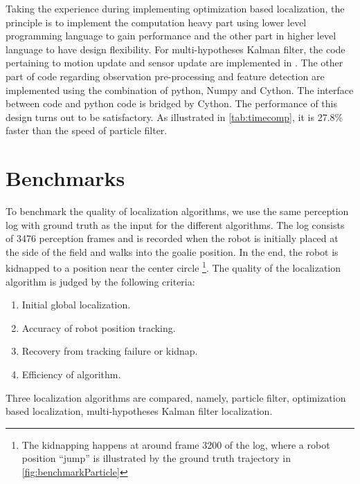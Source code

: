 Taking the experience during implementing optimization based localization, the principle is to implement the computation heavy part using lower level programming language to gain performance and the other part in higher level language to have design flexibility.
For multi-hypotheses Kalman filter, the code pertaining to motion update and sensor update are implemented in \cpp. The other part of code regarding observation pre-processing and feature detection are implemented using the combination of python, Numpy and Cython. The interface between \cpp  code and python code is bridged by Cython. The performance of this design turns out to be satisfactory. As illustrated in \autoref{tab:timecomp}, it is 27.8\% faster than the speed of particle filter.

\section{Benchmarks}
\label{sec:Benchmark}
To benchmark the quality of localization algorithms, we use the same perception log with ground truth as the input for the different algorithms. The log consists of 3476 perception frames and is recorded when the robot is initially placed at the side of the field and walks into the goalie position. In the end, the robot is kidnapped to a position near the center circle \footnote{The kidnapping happens at around frame 3200 of the log, where a robot position ``jump'' is illustrated by the ground truth trajectory in \autoref{fig:benchmarkParticle}}. The quality of the localization algorithm is judged by the following criteria: 
\begin{enumerate}
  \item Initial global localization.
  \item Accuracy of robot position tracking.
  \item Recovery from tracking failure or kidnap.
  \item Efficiency of algorithm.
\end{enumerate}

Three localization algorithms are compared, namely, particle filter, optimization based localization, multi-hypotheses Kalman filter localization.

